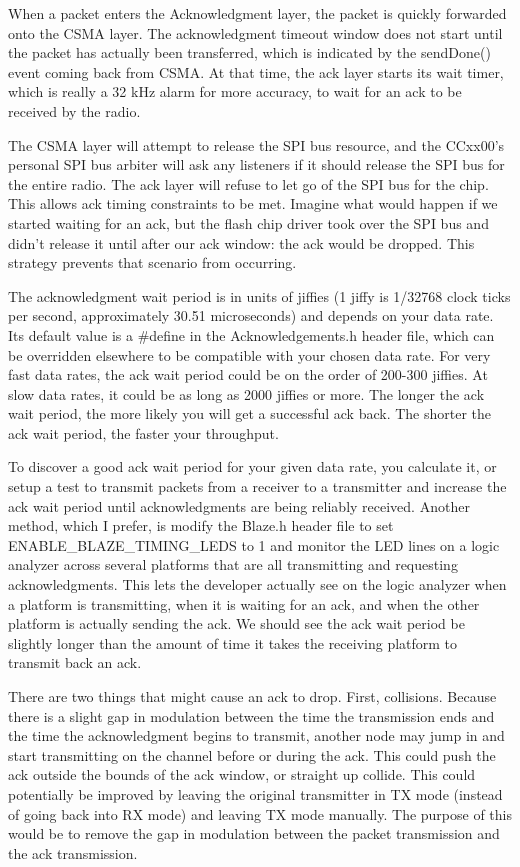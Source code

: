\documentclass{article}
\begin{document}
When a packet enters the Acknowledgment layer, the packet is quickly forwarded
onto the CSMA layer. The acknowledgment timeout window does not start until the 
packet has actually been transferred, which is indicated by the sendDone() event
coming back from CSMA.  At that time, the ack layer starts its wait timer, which 
is really a 32 kHz alarm for more accuracy, to wait for an ack to be received by the radio.

The CSMA layer will attempt to release the SPI bus resource, and the CCxx00's personal SPI
bus arbiter will ask any listeners if it should release the SPI bus for the entire radio.
The ack layer will refuse to let go of the SPI bus for the chip.  This allows ack timing constraints
to be met. Imagine what would happen if we started waiting for an ack, but the flash chip driver
took over the SPI bus and didn't release it until after our ack window: the ack would be dropped.
This strategy prevents that scenario from occurring. 

The acknowledgment wait period is in units of jiffies (1 jiffy is 1/32768 clock ticks
per second, approximately 30.51 microseconds) and depends on your data rate.  
Its default value is a \#define in the Acknowledgements.h
header file, which can be overridden elsewhere to be compatible with your chosen data rate. 
For very fast data rates, the ack wait period could be on the order of 200-300 jiffies.  At slow
data rates, it could be as long as 2000 jiffies or more.  The longer the ack wait period, the more
likely you will get a successful ack back.  The shorter the ack wait period, the faster your
throughput.

To discover a good ack wait period for your given data rate, you calculate it, or setup a test to transmit
packets from a receiver to a transmitter and increase the ack wait period until acknowledgments
are being reliably received.  Another method, which I prefer, is modify the Blaze.h
header file to set ENABLE\_BLAZE\_TIMING\_LEDS to 1 and monitor the LED lines on a logic analyzer
across several platforms that are all transmitting and requesting acknowledgments. This lets the
developer actually see on the logic analyzer when a platform is transmitting, when it is waiting
for an ack, and when the other platform is actually sending the ack. We should see the ack wait
period be slightly longer than the amount of time it takes the receiving platform to transmit
back an ack.

There are two things that might cause an ack to drop. First, collisions. Because there is a slight
gap in modulation between the time the transmission ends and the time the acknowledgment begins to 
transmit, another node may jump in and start transmitting on the channel before or during the ack.
This could push the ack outside the bounds of the ack window, or straight up collide. This could 
potentially be improved by leaving the original transmitter in TX mode (instead of going back
into RX mode) and leaving TX mode manually. The purpose of this would be to remove the gap in
modulation between the packet transmission and the ack transmission.
\end{document}
